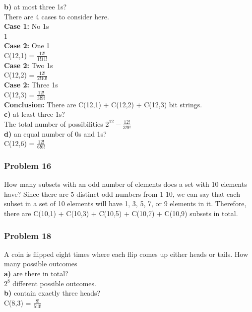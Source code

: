\documentclass[paper=a4, fontsize=11pt]{scrartcl} %
\begin{document}
\textbf{b)} at most three 1s?\\
There are 4 cases to consider here.\\
\textbf{Case 1:} No 1s\\
1\\
\textbf{Case 2:} One 1\\
C(12,1) = $\frac{12!}{1!11!}$\\
\textbf{Case 2:} Two 1s\\
C(12,2) = $\frac{12!}{2!10!}$\\
\textbf{Case 2:} Three 1s\\
C(12,3) = $\frac{12!}{3!9!}$\\

\textbf{Conclusion:} There are C(12,1) + C(12,2) + C(12,3) bit strings.\\

\textbf{c)} at least three 1s?\\
The total number of possibilities $2^12 - \frac{12!}{3!9!}$ \\

\textbf{d)} an equal number of 0s and 1s?\\
C(12,6) = $\frac{12!}{6!6!}$\\

\subsubsection*{Problem 16}
How many subsets with an odd number of elements does a set with 10 elements have?
Since there are 5 distinct odd numbers from 1-10, we can say that each subset in a set of 10 elements will have 1, 3, 5, 7, or 9 elements in it. Therefore, there are C(10,1) + C(10,3) + C(10,5) + C(10,7) + C(10,9) subsets in total.\\
 
\subsubsection*{Problem 18}
A coin is flipped eight times where each flip comes up
either heads or tails. How many possible outcomes\\

\textbf{a)} are there in total?\\
$2^8$ different possible outcomes.\\

\textbf{b)} contain exactly three heads?\\
C(8,3) = $\frac{8!}{5!3!}$\\
\end{document}
